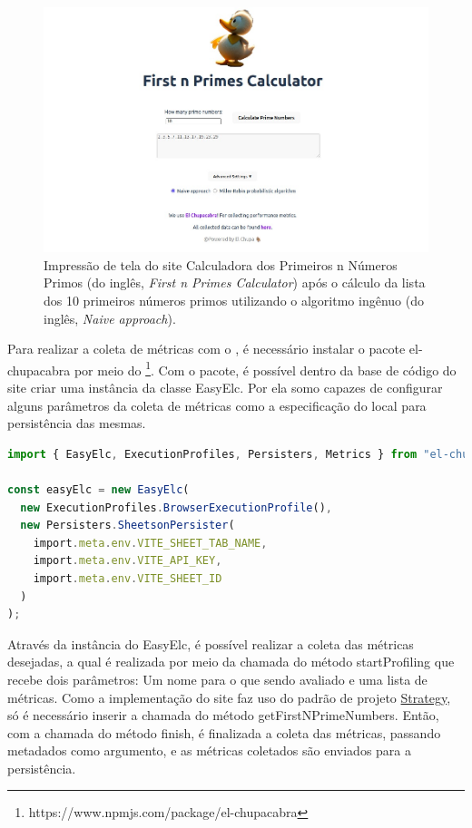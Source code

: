 \documentclass[12pt]{tcc}
\begin{document}
\begin{figure}[!ht]
	\centering
	\includegraphics[width=1\textwidth]{figures/print-elc-numeros-primos.jpeg}
	\caption{Impressão de tela do site Calculadora dos Primeiros n Números Primos (do inglês, \emph{First n Primes Calculator}) após o cálculo da lista dos 10 primeiros números primos utilizando o algoritmo ingênuo (do inglês, \emph{Naive approach}).}
	\label{fig:site-numeros-primos}
\end{figure}

Para realizar a coleta de métricas com o , é necessário instalar o pacote el-chupacabra por meio do \footnote{https://www.npmjs.com/package/el-chupacabra}.
Com o pacote, é possível dentro da base de código do site criar uma instância da classe EasyElc.
Por ela somo capazes de configurar alguns parâmetros da coleta de métricas como a especificação do local para persistência das mesmas.

\begin{minipage}{\linewidth}


\begin{lstlisting}[label={lst:easyelc_setup}, caption={Instância do módulo EasyElc no site Calculadora dos Primeiros n Números Primos.}, language=TypeScript, breaklines=true]
import { EasyElc, ExecutionProfiles, Persisters, Metrics } from "el-chupacabra"

const easyElc = new EasyElc(
  new ExecutionProfiles.BrowserExecutionProfile(),
  new Persisters.SheetsonPersister(
    import.meta.env.VITE_SHEET_TAB_NAME,
    import.meta.env.VITE_API_KEY,
    import.meta.env.VITE_SHEET_ID
  )
);
\end{lstlisting}

\end{minipage}
Através da instância do EasyElc, é possível realizar a coleta das métricas desejadas, a qual é realizada por meio da chamada do método startProfiling que recebe dois parâmetros: Um nome para o que sendo avaliado e uma lista de métricas.
Como a implementação do site faz uso do padrão de projeto \hyperref[subsection:strategy]{Strategy}, só é necessário inserir a chamada do método getFirstNPrimeNumbers.
Então, com a chamada do método finish, é finalizada a coleta das métricas, passando metadados como argumento, e as métricas coletados são enviados para a persistência.
\end{document}
